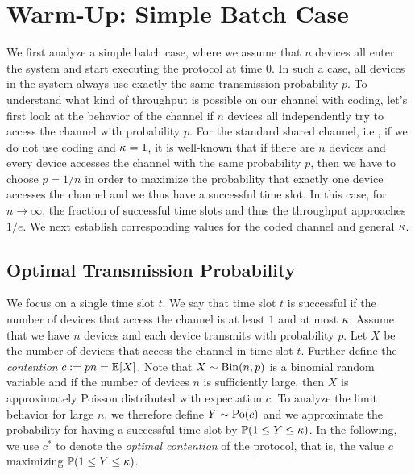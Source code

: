 \section{Warm-Up: Simple Batch Case}
\label{sec:batch}

We first analyze a simple batch case, where we assume that $n$ devices
all enter the system and start executing the protocol at time $0$. In
such a case, all devices in the system always use exactly the same
transmission probability $p$. To understand what kind of throughput is
possible on our channel with coding, let's first look at the behavior
of the channel if $n$ devices all independently try to access the
channel with probability $p$.  For the standard shared channel, i.e.,
if we do not use coding and $\kappa=1$, it is well-known that if
there are $n$ devices and every device accesses the channel with the
same probability $p$, then we have to choose $p=1/n$ in order to
maximize the probability that exactly one device accesses the channel
and we thus have a successful time slot. In this case, for
$n\to\infty$, the fraction of successful time slots and thus the
throughput approaches $1/e$. We next establish corresponding values
for the coded channel and general $\kappa$.

\subsection{Optimal Transmission Probability}

We focus on a single time slot $t$. We say that time slot $t$ is
successful if the number of devices that access the channel is at
least $1$ and at most $\kappa$. Assume that we have $n$ devices
and each device transmits with probability $p$. Let $X$ be the number
of devices that access the channel in time slot $t$. Further define the
\emph{contention} $c:=pn=\operatorname{\mathbb{E}}[X]$. Note that $X\sim\mathrm{Bin}(n,p)$ is a
binomial random variable and if the number of devices $n$ is
sufficiently large, then $X$ is approximately Poisson distributed with
expectation $c$. To analyze the limit behavior for large $n$, we
therefore define $Y\sim \mathrm{Po}(c)$ and we approximate the probability for
having a successful time slot by $\mathbb{P}(1\leq Y\leq \kappa)$. In the
following, we use $c^*$ to denote the \emph{optimal contention} of the
protocol, that is, the value $c$ maximizing $\mathbb{P}(1\leq Y\leq \kappa)$.

